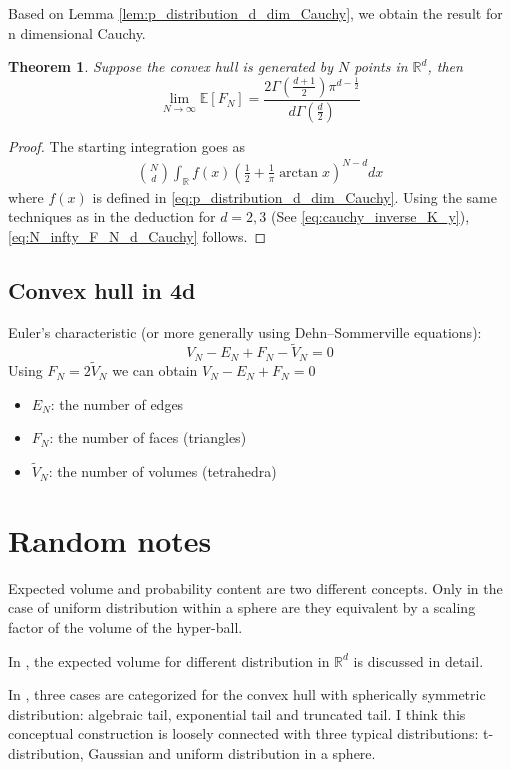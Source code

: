 \documentclass{article}
\newtheorem{theorem}{Theorem}
\def\E{\mathbb{E}}
\def\R{\mathbb{R}}
\begin{document}
Based on
Lemma \ref{lem:p_distribution_d_dim_Cauchy},
we obtain the result
for n dimensional Cauchy.
\begin{theorem}
    Suppose the convex hull is generated by $N$ points in $\R^d$,
    then
\begin{equation}\label{eq:N_infty_F_N_d_Cauchy}
    \lim_{N\to \infty} \E[F_N]
    = \frac{2 \Gamma(\frac{d+1}{2})\pi^{d-\frac{1}{2}}}{d \Gamma(\frac{d}{2})}
\end{equation}
\end{theorem}
\begin{proof}
    The starting integration goes as
    \begin{align}
        \binom{N}{d} \int_{\R}
        f(x)(\frac{1}{2} + \frac{1}{\pi}
        \arctan x)^{N-d} dx
    \end{align}
    where $f(x)$ is defined in
    \eqref{eq:p_distribution_d_dim_Cauchy}.
    Using the same techniques as in the deduction for $d=2,3$
    (See \eqref{eq:cauchy_inverse_K_y}), \eqref{eq:N_infty_F_N_d_Cauchy} follows.
\end{proof}

\subsection{Convex hull in 4d}
Euler's characteristic (or more generally using Dehn–Sommerville equations):
\begin{equation}
    V_N - E_N + F_N - \tilde{V}_N = 0
\end{equation}   
Using $F_N = 2 \tilde{V}_N$
we can obtain $V_N - E_N + F_N = 0$
\begin{itemize}
    \item $E_N$: the number of edges
    \item $F_N$: the number of faces (triangles)
    \item $\tilde{V}_N$: the number of volumes (tetrahedra)
\end{itemize}
\section{Random notes}
Expected volume and probability content are two different concepts.
Only in the case of uniform distribution within a sphere are they equivalent
by a scaling factor of the volume of the hyper-ball.

In \cite{affentranger1991convex},
the expected volume for different distribution in $\R^d$ is discussed in detail.

In \cite{eddy1981convex}, three cases are
categorized for the convex hull with spherically symmetric
distribution: algebraic tail, exponential tail and truncated tail.
I think this conceptual construction is
loosely connected with three typical distributions:
t-distribution, Gaussian and uniform distribution in a sphere.
\end{document}
